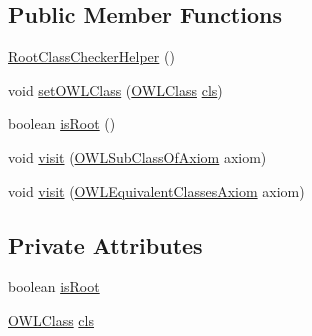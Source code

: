 \subsection*{Public Member Functions}
\begin{DoxyCompactItemize}
\item 
\hyperlink{classorg_1_1semanticweb_1_1owlapi_1_1util_1_1_simple_root_class_checker_1_1_root_class_checker_helper_a97aaf270a6d83e55efbdbc0c12a1215c}{Root\-Class\-Checker\-Helper} ()
\item 
void \hyperlink{classorg_1_1semanticweb_1_1owlapi_1_1util_1_1_simple_root_class_checker_1_1_root_class_checker_helper_af8591c27df9f2e26b965501d469ede0e}{set\-O\-W\-L\-Class} (\hyperlink{interfaceorg_1_1semanticweb_1_1owlapi_1_1model_1_1_o_w_l_class}{O\-W\-L\-Class} \hyperlink{classorg_1_1semanticweb_1_1owlapi_1_1util_1_1_simple_root_class_checker_1_1_root_class_checker_helper_ac1c8277e59cc6fad24a60930c50b8695}{cls})
\item 
boolean \hyperlink{classorg_1_1semanticweb_1_1owlapi_1_1util_1_1_simple_root_class_checker_1_1_root_class_checker_helper_a22b3631acb1a603c7a93e8a2604b0986}{is\-Root} ()
\item 
void \hyperlink{classorg_1_1semanticweb_1_1owlapi_1_1util_1_1_simple_root_class_checker_1_1_root_class_checker_helper_a8c71f8e14f1e23c8332d9b68622bfe09}{visit} (\hyperlink{interfaceorg_1_1semanticweb_1_1owlapi_1_1model_1_1_o_w_l_sub_class_of_axiom}{O\-W\-L\-Sub\-Class\-Of\-Axiom} axiom)
\item 
void \hyperlink{classorg_1_1semanticweb_1_1owlapi_1_1util_1_1_simple_root_class_checker_1_1_root_class_checker_helper_a1257f8ecb0a889849637635fe54c983b}{visit} (\hyperlink{interfaceorg_1_1semanticweb_1_1owlapi_1_1model_1_1_o_w_l_equivalent_classes_axiom}{O\-W\-L\-Equivalent\-Classes\-Axiom} axiom)
\end{DoxyCompactItemize}
\subsection*{Private Attributes}
\begin{DoxyCompactItemize}
\item 
boolean \hyperlink{classorg_1_1semanticweb_1_1owlapi_1_1util_1_1_simple_root_class_checker_1_1_root_class_checker_helper_aaa17285b9b99b240fea705ba12443cd0}{is\-Root}
\item 
\hyperlink{interfaceorg_1_1semanticweb_1_1owlapi_1_1model_1_1_o_w_l_class}{O\-W\-L\-Class} \hyperlink{classorg_1_1semanticweb_1_1owlapi_1_1util_1_1_simple_root_class_checker_1_1_root_class_checker_helper_ac1c8277e59cc6fad24a60930c50b8695}{cls}
\end{DoxyCompactItemize}


